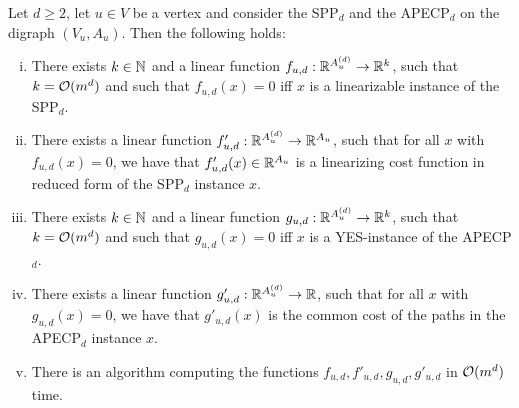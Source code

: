 \begin{lemma}
\label{lemma:subspaces-induction}
    Let $d \geq 2$, let $u \in V$ be a vertex and consider the  SPP$_d$ and the APECP$_{d}$ on the digraph $(V_u, A_u)$. Then the following holds:
    \begin{enumerate}[(i)]
        \item There exists $k \in \mathbb{N}$ and a linear function $f_{u,d} : \mathbb{R}^{A_u^{(d)}} \rightarrow \mathbb{R}^k$, such that $k = \mathcal{O}(m^{d})$ and such that $f_{u,d}(x) = 0$ iff $x$ is a linearizable instance of the SPP$_{d}$.
        \item There exists a linear function $f'_{u,d} : \mathbb{R}^{A_u^{(d)}} \rightarrow \mathbb{R}^{A_u}$, such that for all $x$ with $f_{u,d}(x) = 0$, we have that $f'_{u,d}(x) \in \mathbb{R}^{A_u}$ is a linearizing cost function in reduced form of the SPP$_d$ instance $x$.
        \item There exists $k \in \mathbb{N}$ and a linear function $g_{u,d} : \mathbb{R}^{A_u^{(d)}} \rightarrow \mathbb{R}^k$, such that $k = \mathcal{O}(m^{d})$ and such that $g_{u,d}(x) = 0$ iff $x$ is a YES-instance of the APECP$_{d}$.
        \item There exists a linear function $g'_{u,d} : \mathbb{R}^{A_u^{(d)}} \rightarrow \mathbb{R}$, such that for all $x$ with $g_{u,d}(x) = 0$, we have that $g'_{u,d}(x)$ is the common cost of the paths in the APECP$_{d}$ instance $x$.
        \item There is an algorithm computing the functions $f_{u,d}, f'_{u,d}, g_{u,d}, g'_{u,d}$ in $\mathcal{O}(m^d)$ time.
    \end{enumerate}
\end{lemma}
